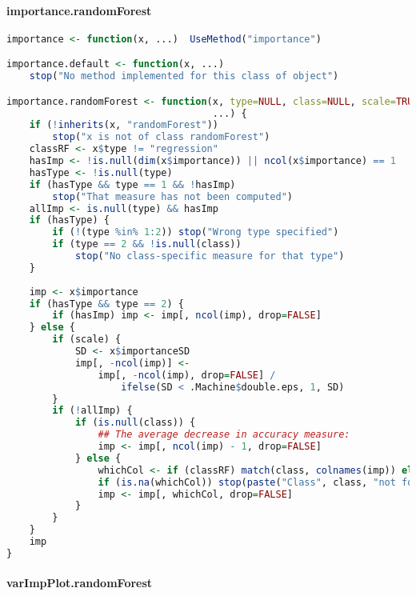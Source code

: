 \documentclass[10pt,a4paper]{article}
\begin{document}
\paragraph{importance.randomForest}
\begin{lstlisting}[language=R]
importance <- function(x, ...)  UseMethod("importance")

importance.default <- function(x, ...)
    stop("No method implemented for this class of object")

importance.randomForest <- function(x, type=NULL, class=NULL, scale=TRUE,
                                    ...) {
    if (!inherits(x, "randomForest"))
        stop("x is not of class randomForest")
    classRF <- x$type != "regression"
    hasImp <- !is.null(dim(x$importance)) || ncol(x$importance) == 1
    hasType <- !is.null(type)
    if (hasType && type == 1 && !hasImp)
        stop("That measure has not been computed")
    allImp <- is.null(type) && hasImp
    if (hasType) {
        if (!(type %in% 1:2)) stop("Wrong type specified")
        if (type == 2 && !is.null(class))
            stop("No class-specific measure for that type")
    }
    
    imp <- x$importance
    if (hasType && type == 2) {
        if (hasImp) imp <- imp[, ncol(imp), drop=FALSE]
    } else {
        if (scale) {
            SD <- x$importanceSD
            imp[, -ncol(imp)] <-
                imp[, -ncol(imp), drop=FALSE] /
                    ifelse(SD < .Machine$double.eps, 1, SD)
        }
        if (!allImp) {
            if (is.null(class)) {
                ## The average decrease in accuracy measure:
                imp <- imp[, ncol(imp) - 1, drop=FALSE]
            } else {
                whichCol <- if (classRF) match(class, colnames(imp)) else 1
                if (is.na(whichCol)) stop(paste("Class", class, "not found."))
                imp <- imp[, whichCol, drop=FALSE]
            }
        }
    }
    imp
}
\end{lstlisting}
\paragraph*{varImpPlot.randomForest}
\end{document}
